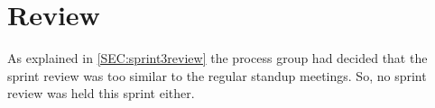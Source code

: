 \section{Review}
As explained in \autoref{SEC:sprint3review} the process group had decided that the sprint review was too similar to the regular standup meetings.
So, no sprint review was held this sprint either.
